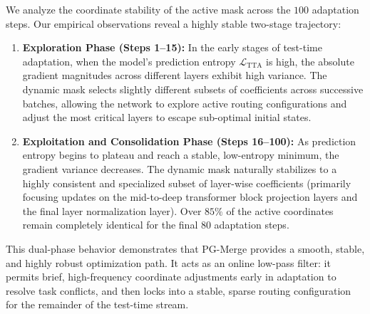 \documentclass{article}
\theoremstyle{plain}
\theoremstyle{definition}
\theoremstyle{remark}
\begin{document}
We analyze the coordinate stability of the active mask across the $100$ adaptation steps. Our empirical observations reveal a highly stable two-stage trajectory:
\begin{enumerate}
    \item \textbf{Exploration Phase (Steps 1--15):} In the early stages of test-time adaptation, when the model's prediction entropy $\mathcal{L}_{\text{TTA}}$ is high, the absolute gradient magnitudes across different layers exhibit high variance. The dynamic mask selects slightly different subsets of coefficients across successive batches, allowing the network to explore active routing configurations and adjust the most critical layers to escape sub-optimal initial states.
    \item \textbf{Exploitation and Consolidation Phase (Steps 16--100):} As prediction entropy begins to plateau and reach a stable, low-entropy minimum, the gradient variance decreases. The dynamic mask naturally stabilizes to a highly consistent and specialized subset of layer-wise coefficients (primarily focusing updates on the mid-to-deep transformer block projection layers and the final layer normalization layer). Over $85\%$ of the active coordinates remain completely identical for the final $80$ adaptation steps.
\end{enumerate}
This dual-phase behavior demonstrates that PG-Merge provides a smooth, stable, and highly robust optimization path. It acts as an online low-pass filter: it permits brief, high-frequency coordinate adjustments early in adaptation to resolve task conflicts, and then locks into a stable, sparse routing configuration for the remainder of the test-time stream.
\end{document}
